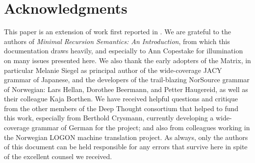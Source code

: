 \documentclass[12pt]{article}
\begin{document}
\section{Acknowledgments}

This paper is an extension of work first reported in .
We are grateful to the authors of {\it Minimal Recursion Semantics: An
Introduction}, from which this documentation draws heavily, and especially to
Ann Copestake for illumination on many issues presented here.  We also thank
the early adopters of the Matrix, in particular Melanie Siegel as principal
author of the wide-coverage JACY grammar of Japanese, and the developers of
the trail-blazing NorSource grammar of Norwegian: Lars Hellan, Dorothee
Beermann, and Petter Haugereid, as well as their colleague Kaja Borthen.  We
have received helpful questions and critique from the other members of the
Deep Thought consortium that helped to fund this work, especially from
Berthold Crysmann, currently developing a wide-coverage grammar of German for
the project; and also from colleagues working in the Norwegian LOGON machine
translation project.  As always, only the authors of this document can be
held responsible for any errors that survive here in spite of the excellent
counsel we received.




\end{document}
